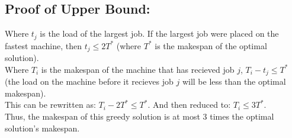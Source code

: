 \documentclass[11pt]{article}
\begin{document}
\subsection*{Proof of Upper Bound:}
Where $t_j$ is the load of the largest job.
If the largest job were placed on the fastest machine, then $t_j \leq 2T^*$ (where $T^*$ is the makespan of the optimal solution).\\
Where $T_i$ is the makespan of the machine that has recieved job $j$, $T_i - t_j \leq T^*$
(the load on the machine before it recieves job $j$ will be less than the optimal makespan).\\
This can be rewritten as: $T_i - 2T^* \leq T^*$. And then reduced to: $T_i \leq 3T^*$.\\
Thus, the makespan of this greedy solution is at most 3 times the optimal solution's makespan.
\end{document}
